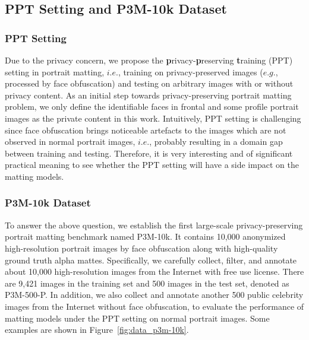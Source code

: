 \documentclass[sigconf]{acmart}
\begin{document}
\subsection{PPT Setting and P3M-10k Dataset}
\subsubsection{PPT Setting}
Due to the privacy concern, we propose the \textbf{p}rivacy-\textbf{p}reserving \textbf{t}raining (PPT) setting in portrait matting, $i.e.$, training on privacy-preserved images ($e.g.$, processed by face obfuscation) and testing on arbitrary images with or without privacy content. As an initial step towards privacy-preserving portrait matting problem, we only define the identifiable faces in frontal and some profile portrait images as the private content in this work. Intuitively, PPT setting is challenging since face obfuscation brings noticeable artefacts to the images which are not observed in normal portrait images, $i.e.$, probably resulting in a domain gap between training and testing. Therefore, it is very interesting and of significant practical meaning to see whether the PPT setting will have a side impact on the matting models.


\subsubsection{P3M-10k Dataset}

To answer the above question, we establish the first large-scale privacy-preserving portrait matting benchmark named P3M-10k. It contains 10,000 anonymized high-resolution portrait images by face obfuscation along with high-quality ground truth alpha mattes. Specifically, we carefully collect, filter, and annotate about 10,000 high-resolution images from the Internet with free use license. There are 9,421 images in the training set and 500 images in the test set, denoted as P3M-500-P. In addition, we also collect and annotate another 500 public celebrity images from the Internet without face obfuscation, to evaluate the performance of matting models under the PPT setting on normal portrait images. Some examples are shown in Figure~\ref{fig:data_p3m-10k}.
\end{document}
